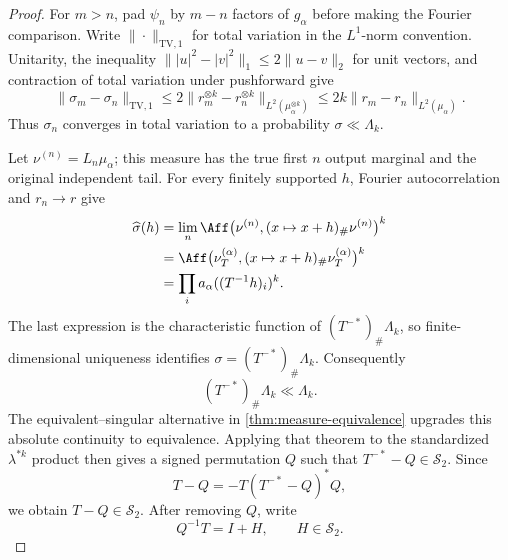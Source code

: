 \begin{proof}
For \(m>n\), pad \(\psi_n\) by \(m-n\) factors of \(g_\alpha\) before
making the Fourier comparison.
Write \(\|\cdot\|_{\mathrm{TV},1}\) for total variation in the
\(L^1\)-norm convention.  Unitarity, the inequality
\(\||u|^2-|v|^2\|_1\le2\|u-v\|_2\) for unit vectors, and contraction of
total variation under pushforward give
\begin{equation}
 \|\sigma_m-\sigma_n\|_{\mathrm{TV},1}
 \le2\|r_m^{\otimes k}-r_n^{\otimes k}\|_{L^2(\mu_\alpha^{\otimes k})}
 \le2k\|r_m-r_n\|_{L^2(\mu_\alpha)}.
 \label{eq:stable-fourier-transfer-tv-bound}
\end{equation}
Thus \(\sigma_n\) converges in total variation to a probability
\(\sigma\ll\Lambda_k\).

Let \(\nu^{(n)}=L_n\mu_\alpha\); this measure has the true first \(n\)
output marginal and the original independent tail.
For every finitely supported \(h\), Fourier autocorrelation and
\(r_n\to r\) give
\begin{align*}
 \widehat\sigma(h)
 &=\lim_n\Aff\bigl(\nu^{(n)},(x\mapsto x+h)_\#\nu^{(n)}\bigr)^k\\
 &=\Aff\bigl(\nu_T^{(\alpha)},
        (x\mapsto x+h)_\#\nu_T^{(\alpha)}\bigr)^k\\
 &=\prod_i a_\alpha((T^{-1}h)_i)^k.
\end{align*}
The last expression is the characteristic function of
\((T^{-*})_\#\Lambda_k\), so finite-dimensional uniqueness identifies
\(\sigma=(T^{-*})_\#\Lambda_k\).
Consequently
\begin{equation}
 (T^{-*})_\#\Lambda_k\ll\Lambda_k.
 \label{eq:stable-fourier-transfer}
\end{equation}
The equivalent--singular alternative in \cref{thm:measure-equivalence}
upgrades this absolute continuity to equivalence.  Applying that theorem to
the standardized \(\lambda^{*k}\) product then gives a signed permutation
\(Q\) such that
\(T^{-*}-Q\in\mathcal S_2\).
Since
\[
 T-Q=-T(T^{-*}-Q)^*Q,
\]
we obtain \(T-Q\in\mathcal S_2\).
After removing \(Q\), write
\begin{equation}
 Q^{-1}T=I+H,
 \qquad H\in\mathcal S_2.
 \label{eq:stable-hilbert-schmidt-match}
\end{equation}


\end{proof}
